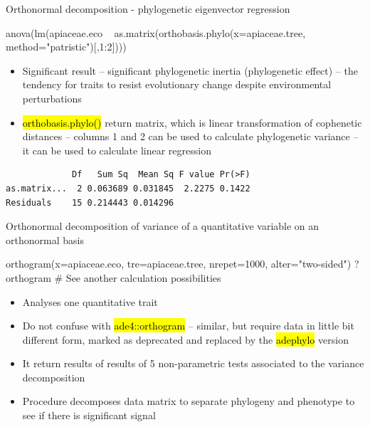 \documentclass[compress, ucs, xelatex, 11pt, xcolor=svgnames,
  hyperref={
    bookmarks=true,
    unicode=true,
    colorlinks=true,
    pdftitle={Molecular data in R},
    plainpages=false,
    pdfauthor={Vojtech Zeisek},
    pdfsubject={Course about phylogeny and evolution in R},
    pdfcreator={XeLaTeX},
    pdfkeywords={R, evolution, phylogeny, molecular data},
    linkcolor=Tomato,
    anchorcolor=SaddleBrown,
    citecolor=Goldenrod,
    filecolor=DarkMagenta,
    menucolor=Sienna,
    urlcolor=DarkTurquoise,
    pdftex},
  url={hyphens, lowtilde} %
  ]{beamer}
\renewcommand{\texttt}[1]{\hl{\ttfamily #1}}
\begin{document}
\begin{frame}[fragile]{Orthonormal decomposition - phylogenetic eigenvector regression}
  \begin{spluscode}
    anova(lm(apiaceae.eco ~ as.matrix(orthobasis.phylo(x=apiaceae.tree,
      method="patristic")[,1:2])))
  \end{spluscode}
  \begin{itemize}
    \item Significant result -- significant phylogenetic inertia (phylogenetic effect) -- the tendency for traits to resist evolutionary change despite environmental perturbations
    \item \texttt{orthobasis.phylo()} return matrix, which is linear transformation of cophenetic distances -- columns 1 and 2 can be used to calculate phylogenetic variance -- it can be used to calculate linear regression
  \end{itemize}
  \begin{verbatim}
             Df   Sum Sq  Mean Sq F value Pr(>F)
as.matrix...  2 0.063689 0.031845  2.2275 0.1422
Residuals    15 0.214443 0.014296
  \end{verbatim}
\end{frame}

\begin{frame}[fragile]{Orthonormal decomposition of variance of a quantitative variable on an orthonormal basis}
  \begin{spluscode}
    orthogram(x=apiaceae.eco, tre=apiaceae.tree, nrepet=1000,
      alter="two-sided")
    ?orthogram # See another calculation possibilities
  \end{spluscode}
  \begin{itemize}
    \item Analyses one quantitative trait
    \item Do not confuse with \texttt{ade4::orthogram} -- similar, but require data in little bit different form, marked as deprecated and replaced by the \texttt{adephylo} version
    \item It return results of results of 5 non-parametric tests associated to the variance decomposition
    \item Procedure decomposes data matrix to separate phylogeny and phenotype to see if there is significant signal
  \end{itemize}
\end{frame}
\end{document}
